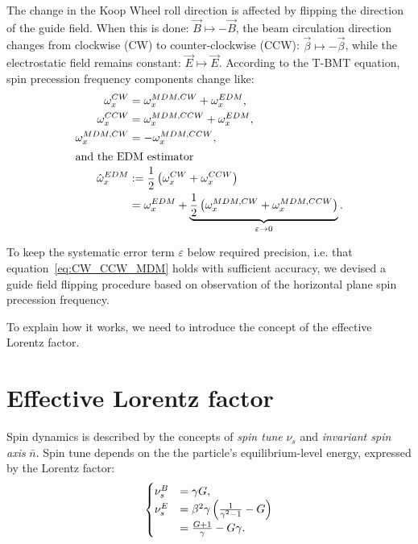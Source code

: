 \documentclass[a4paper]{jacow}
\newcommand{\w}{\omega}
\newcommand{\nbar}{\bar n}
\begin{document}
The change in the Koop Wheel roll direction is affected by flipping the direction of the guide field. When this is done:
$\vec B \mapsto -\vec B$, the beam circulation direction changes from clockwise (CW) to counter-clockwise (CCW): 
$\vec\beta \mapsto -\vec\beta$, while the electrostatic field remains constant: $\vec E \mapsto \vec E$.
According to the T-BMT equation, spin precession frequency components change like:
\begin{subequations}
  \begin{align}
    \w_x^{CW} &= \w_x^{MDM, CW}   + \w_x^{EDM}, \notag\\
    \w_x^{CCW} &= \w_x^{MDM, CCW} + \w_x^{EDM}, \notag\\
    \w_x^{MDM, CW} &= -\w_x^{MDM, CCW}, \label{eq:CW_CCW_MDM}\\
    \intertext{and the EDM estimator}
    \hat\w_x^{EDM} &:= \frac12\bkt{\w_x^{CW} + \w_x^{CCW}} \label{eq:FDM_estimator} \\
                   &=  \w_x^{EDM} +
                       \underbrace{\frac12\bkt{\w_x^{MDM, CW} + \w_x^{MDM, CCW}}}_{\varepsilon \to 0}.
  \end{align}
\end{subequations}

To keep the systematic error term $\varepsilon$ below required precision, i.e.
that equation~\eqref{eq:CW_CCW_MDM} holds with sufficient accuracy, we devised a guide field flipping procedure
based on observation of the horizontal plane spin precession frequency.

To explain how it works, we need to introduce the concept of the effective Lorentz factor.

\section{Effective Lorentz factor}
Spin dynamics is described by the concepts of \emph{spin tune} $\nu_s$ and \emph{invariant spin axis} $\nbar$.
Spin tune depends on the the particle's  equilibrium-level energy, expressed by the Lorentz factor:
\begin{equation}\label{eq:spin_tune_vs_gamma}
  \begin{cases}
    \nu_s^B &= \gamma G, \\
    \nu_s^E &= \beta^2\gamma\bkt{\frac{1}{\gamma^2-1} - G} \\
            &= \frac{G+1}{\gamma} - G\gamma.
  \end{cases}
\end{equation}
\end{document}
